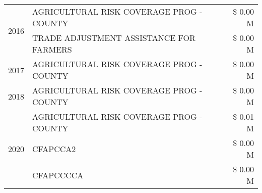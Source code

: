 \begin{tabular}{llr}
\multirow[t]{2}{*}{2016} & AGRICULTURAL RISK COVERAGE PROG - COUNTY      & \$ 0.00 M \\
 & TRADE ADJUSTMENT ASSISTANCE FOR FARMERS       & \$ 0.00 M \\
\cline{1-3}
2017 & AGRICULTURAL RISK COVERAGE PROG - COUNTY & \$ 0.00 M \\
\cline{1-3}
2018 & AGRICULTURAL RISK COVERAGE PROG - COUNTY & \$ 0.00 M \\
\cline{1-3}
\multirow[t]{3}{*}{2020} & AGRICULTURAL RISK COVERAGE PROG - COUNTY & \$ 0.01 M \\
 & CFAPCCA2 & \$ 0.00 M \\
 & CFAPCCCCA & \$ 0.00 M \\
\cline{1-3}
\bottomrule
\end{tabular}
